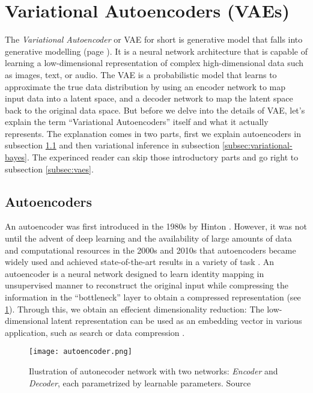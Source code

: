 \section{Variational Autoencoders (VAEs)}
\label{sec:vae}
The \textit{Variational Autoencoder} or VAE for short is generative model that falls into generative modelling (page \pageref{generative-modelling}). 
It is a neural network architecture that is capable of learning a low-dimensional representation of complex high-dimensional data such as 
images, text, or audio. The VAE is a probabilistic model that learns to approximate the true data distribution by using an encoder network to 
map input data into a latent space, and a decoder network to map the latent space back to the original data space. But before we delve into the details of VAE, 
let's explain the term ``Variational Autoencoders'' itself and what it actually represents. The explanation comes in two parts, first we explain 
autoencoders in subsection \ref{subsec:autoencoders} and then variational inference in subsection \ref{subsec:variational-bayes}. The experinced reader can skip those 
introductory parts and go right to subsection \ref{subsec:vaes}.

\subsection{Autoencoders}
\label{subsec:autoencoders}
An autoencoder was first introduced in the 1980s by Hinton \cite{autoencoders-1986}. However, it was not until the advent of deep learning 
and the availability of large amounts of data and computational resources in the 2000s and 2010s that autoencoders became widely used and 
achieved state-of-the-art results in a variety of task \cite{dim-reduction-ae-2006}. An autoencoder is a neural network designed to learn 
identity mapping in unsupervised manner to reconstruct the original input while compressing the information in the ``bottleneck'' layer 
to obtain a compressed representation (see \ref{fig:autoencoder}). Through this, we obtain an effecient dimensionality reduction: The low-dimensional 
latent representation can be used as an embedding vector in various application, such as search or data compression \cite{ae-blog-2018}.

\begin{figure}[t]
    \centering
    \texttt{[image: autoencoder.png]}
    \caption[Autoencoder]{Ilustration of autonecoder network with two networks: \textit{Encoder} and \textit{Decoder}, each parametrized by learnable parameters.
    Source \cite{ae-blog-2018}}
    \label{fig:autoencoder}
\end{figure}

